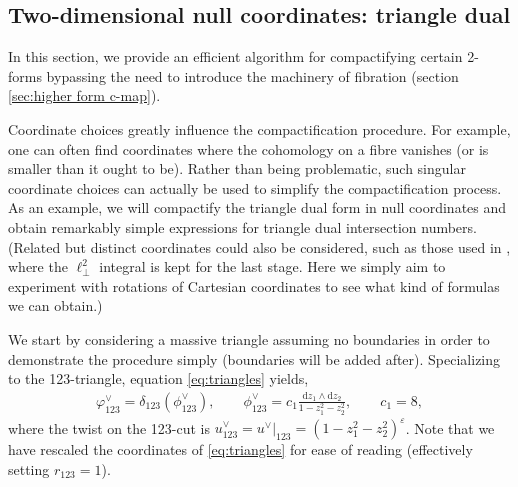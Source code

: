 \documentclass[11pt]{article}
\renewcommand{\d}{\text{d}}
\newcommand{\F}{\mathcal{F}}
\newcommand{\vphi}{\varphi}
\newcommand{\vep}{\varepsilon}
\begin{document}
\subsection{Two-dimensional null coordinates: triangle dual \label{sec:ctri}}

In this section, we provide an efficient algorithm for compactifying certain 2-forms
bypassing the need to introduce the machinery of fibration (section \ref{sec:higher form c-map}). 

Coordinate choices greatly influence the compactification procedure. 
For example, one can often find coordinates where the cohomology on a fibre vanishes (or is smaller than it ought to be). 
Rather than being problematic, such singular coordinate choices can actually be used to simplify the compactification process. 
As an example, we will compactify the triangle dual form in null coordinates and obtain  remarkably simple expressions for triangle dual intersection numbers.
(Related but distinct coordinates could also be considered, such as those used in \cite{Forde:2007mi,Badger:2008cm,Giele:2008ve}, where the $\ell_\perp^2$
integral is kept for the last stage. Here we simply aim to experiment with rotations of Cartesian coordinates to see what kind of formulas we can obtain.)

We start by considering a massive triangle assuming no boundaries in order to demonstrate the procedure simply (boundaries will be added after). Specializing to the 123-triangle, equation \eqref{eq:triangles} yields, 
\begin{align}
	\vphi^\vee_{123} = \delta_{123}(\phi^\vee_{123}),
	\qquad 
	\phi^\vee_{123} = c_1 \frac{\d z_1 \wedge \d z_2}{1 - z_1^2 -z_2^2},
	\qquad
	c_1 = 8,
\end{align}
where the twist on the 123-cut is $u^\vee_{123} = u^\vee\vert_{123} = (1 - z_1^2 -z_2^2)^\vep$. Note that we have rescaled the coordinates of \eqref{eq:triangles} for ease of reading (effectively setting $r_{123}=1$). 

\end{document}
